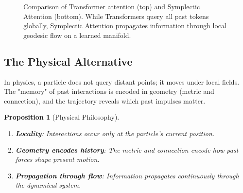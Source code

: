 \documentclass[12pt,letterpaper,twoside]{article}
\newtheorem{prop}{Proposition}[section]
\begin{document}
\begin{figure}[htbp]
\caption{Comparison of Transformer attention (top) and Symplectic Attention (bottom). While Transformers query all past tokens globally, Symplectic Attention propagates information through local geodesic flow on a learned manifold.}
\label{fig:attention-comparison}
\end{figure}

\subsection{The Physical Alternative}

In physics, a particle does not query distant points; it moves under local fields. The "memory" of past interactions is encoded in geometry (metric and connection), and the trajectory reveals which past impulses matter.

\begin{prop}[Physical Philosophy]
\begin{enumerate}
\item \textbf{Locality}: Interactions occur only at the particle's current position.
\item \textbf{Geometry encodes history}: The metric and connection encode how past forces shape present motion.
\item \textbf{Propagation through flow}: Information propagates continuously through the dynamical system.
\end{enumerate}
\end{prop}
\end{document}
